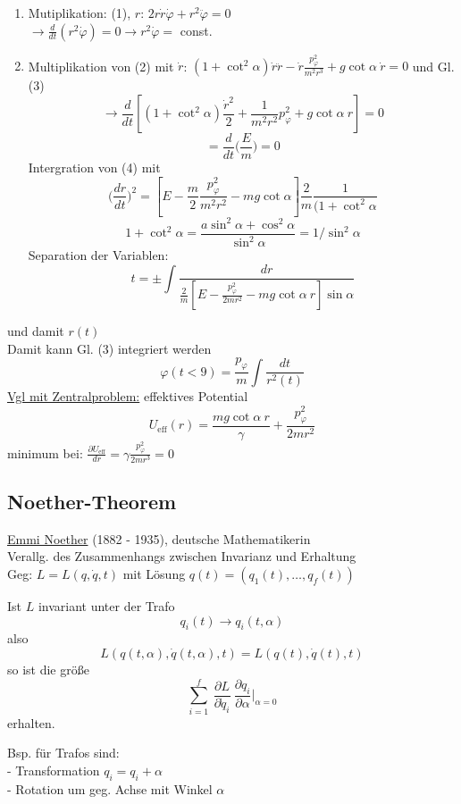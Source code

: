 \documentclass[titlepage,12pt,a4paper,ngerman]{report}
\newcommand{\tx}[1]{\textrm{#1}}
\newcommand{\summ}[2]{\sum_{#1}^{#2}}
\newcommand{\frbox}[2]{\begin{tcolorbox}[colback=white,colframe=red!75!black,fonttitle=\bfseries,title=#1]#2\end{tcolorbox}} %
\begin{document}
\begin{enumerate}
	\item Mutiplikation: (1), $r$: 	$2r \dot r \dot \varphi + r^2 \ddot \varphi = 0$\\
	$\rightarrow \frac{d}{dt}(r^2 \dot \varphi) = 0 \rightarrow r^2 \dot \varphi=$ const.
	\item Multiplikation von (2) mit $\dot r$: 	 $(1 + \cot^2 \alpha) \dot r \ddot r - \dot r \frac{p_\varphi^2}{m^2 r^3} + g \cot \alpha\ \dot r = 0$ und Gl. (3) 
	$$\rightarrow \frac{d}{dt} [(1 + \cot^2 \alpha) \frac{\dot r^2}{2} + \frac{1}{m^2 r^2} p_\varphi^2 + g \cot \alpha\ r ] = 0$$
	$$ = \frac{d}{dt} \bigg(\frac{E}{m}\bigg) = 0$$
	Intergration von (4) mit
	$$\bigg(\frac{dr}{dt}\bigg)^2 = [E - \frac{m}{2} \frac{p_\varphi^2}{m^2 r^2} - mg \cot \alpha] \frac{2}{m}\frac{1}{(1+\cot^2 \alpha}$$
	$$1 + \cot^2 \alpha = \frac{a\sin^2 \alpha + \cos^2 \alpha}{\sin^2 \alpha}= 1/\sin^2 \alpha$$
	Separation der Variablen:
	\begin{equation*}
	t = \pm \int \frac{dr}{\frac{2}{m} [E- \frac{p_\varphi^2}{2mr^2}-mg \cot \alpha\ r]\sin \alpha}	\tag*{(5)}
	\end{equation*}
\end{enumerate}
und damit $r(t)$\\
Damit kann Gl. (3) integriert werden
\begin{equation*}
\varphi(t<9) = \frac{p_\varphi}{m} \int \frac{dt}{r^2(t)} \tag{6}
\end{equation*}
\underline{Vgl mit Zentralproblem:} effektives Potential
$$U_{\tx{eff}}(r) = \frac{mg \cot \alpha\ r}{\gamma} + \frac{p_\varphi^2}{2mr^2}$$
minimum bei: $\frac{\partial U_{\tx{eff}}}{dr} = \gamma \frac{p_\varphi^2}{2mr^3} = 0$

\subsection{Noether-Theorem}
\setcounter{equation}{0}
\underline{Emmi Noether} (1882 - 1935), deutsche Mathematikerin\\
Verallg. des Zusammenhangs zwischen Invarianz und Erhaltung\\
Geg: $ L = L(q, \dot q, t)$ mit Lösung $q(t) = (q_1(t), \dots, q_f(t))$\\

\frbox{\tx{,,Noether Theorem``}}{Ist $L$ invariant unter der Trafo
	\begin{equation}\label{nt:1}
	q_i (t) \rightarrow q_i (t,\alpha) \tag*{(1)}
	\end{equation}
	also
	\begin{equation}\label{nt:2}
	L (q(t, \alpha), \dot q(t,\alpha),t) = L(q(t),\dot q (t),t) \tag*{(2)}
	\end{equation}
	so ist die größe 
	\begin{equation}\label{nt:3}
	\summ{i=1}{f}\ \frac{\partial L}{\partial\dot q_i}\ \frac{\partial q_i}{\partial \alpha}\bigg|_{\alpha=0} \tag*{(3)}
	\end{equation}
	erhalten.
}
\noindent Bsp. für Trafos sind:\\
\indent - Transformation $q_i = q_i + \alpha$\\
\indent - Rotation um geg. Achse mit Winkel $\alpha$\\
\end{document}

